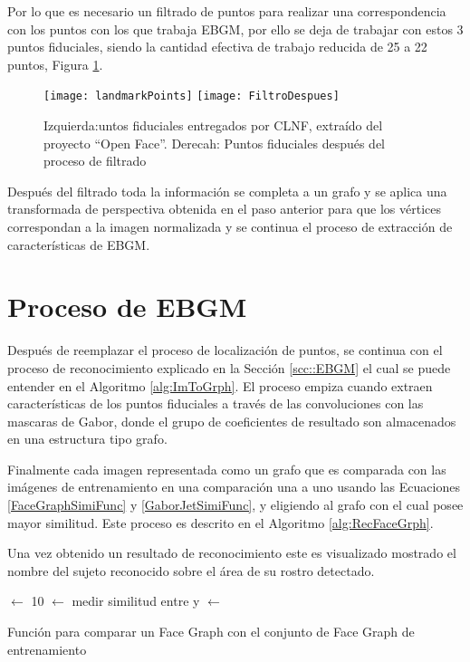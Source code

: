 Por lo que es necesario un filtrado de puntos para realizar una correspondencia con los puntos con los que trabaja \ac{EBGM}, por ello se deja de trabajar con estos 3 puntos fiduciales, siendo la cantidad efectiva de trabajo reducida de 25 a 22 puntos, Figura \ref{im:22Landmark}.

\begin{figure}[h]
\center
\texttt{[image: landmarkPoints]}
\texttt{[image: FiltroDespues]}
\caption{Izquierda:untos fiduciales entregados por \ac{CLNF}, extraído del proyecto ``Open Face''. Derecah: Puntos fiduciales después del proceso de filtrado}
\label{im:22Landmark}
\end{figure}

Después del filtrado toda la información se completa a un grafo y se aplica una transformada de perspectiva obtenida en el paso anterior para que los vértices correspondan a la imagen normalizada y se continua el proceso de extracción de características de \ac{EBGM}.{}

\section{Proceso de \ac{EBGM}}
Después de reemplazar el proceso de localización de puntos, se continua con el proceso de reconocimiento explicado en la Sección \ref{scc::EBGM} el cual se puede entender en el Algoritmo \ref{alg:ImToGrph}. El proceso empiza cuando extraen características de los puntos fiduciales a través de las convoluciones con las mascaras de Gabor, donde el grupo de coeficientes de resultado son almacenados en una estructura tipo grafo.

Finalmente cada imagen representada como un grafo que es comparada con las imágenes de entrenamiento en una comparación una a uno usando las Ecuaciones \ref{FaceGraphSimiFunc} y \ref{GaborJetSimiFunc}, y eligiendo al grafo con el cual posee mayor similitud. Este proceso es descrito en el Algoritmo \ref{alg:RecFaceGrph}.

Una vez obtenido un resultado de reconocimiento este es visualizado mostrado el nombre del sujeto reconocido sobre el área de su rostro detectado.

\begin{algorithm}
\label{alg:RecFaceGrph}
\;
 $\gets$ 10\;
{
	 $\gets$ medir similitud entre  y \;
    {
    	 $\gets$ \;
    }
}
\;
\caption{Función para comparar un Face Graph con el conjunto de Face Graph de entrenamiento}
\end{algorithm}

